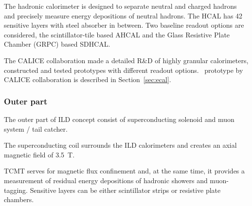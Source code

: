 The hadronic calorimeter is designed to separate neutral and charged hadrons and precisely measure energy depositions of neutral hadrons. The HCAL has 42 sensitive layers with steel absorber in between. Two baseline readout options are considered, the scintillator-tile based AHCAL and the Glass Resistive Plate Chamber (GRPC) based SDHCAL.

The CALICE collaboration made a detailed R\&D of highly granular calorimeters, constructed and tested prototypes with different readout options. 
\ecal\ prototype by CALICE collaboration is described in Section~\ref{sec:ecal}.


\subsubsection{Outer part}

The outer part of ILD concept consist of superconducting solenoid and muon system / tail catcher. 

The superconducting coil surrounds the ILD calorimeters and creates an axial magnetic field of 3.5~T.

TCMT serves for magnetic flux confinement and, at the same time, it provides a measurement of residual energy depositions of hadronic showers and muon-tagging. Sensitive layers can be either scintillator strips or resistive plate chambers. 


